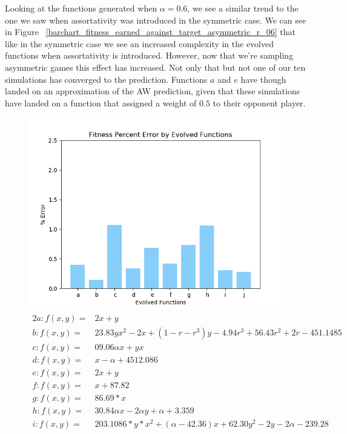 \documentclass[11pt]{book}
\newcommand*{\np}{\par\noindent\newline}
\begin{document}
\np Looking at the functions generated when $\alpha = 0.6$, we see a similar trend to the one we saw when assortativity was introduced in the symmetric case.
We can see in Figure ~\ref{barchart_fitness_earned_against_target_asymmetric_r_06} that like in the symmetric case we see an increased complexity in the evolved functions when assortativity is introduced.
However, now that we're sampling asymmetric games this effect has increased.
Not only that but not one of our ten simulations has converged to the prediction.
Functions $a$ and $e$ have though landed on an approximation of the AW prediction, given that these simulations have landed on a function that assigned a weight of $0.5$ to their opponent player.


\begin{figure}
	\centering
	\includegraphics[scale=0.7]{resources/asymmetric_percenterror_barchart_fitness_earned_against_target_asymmetric_r_06.png}
	\begin{alignat*}{2}
		a: f(x, y) = & 2x + y\\
		b: f(x, y) = & 23.83yx^2 - 2x + (1 - r - r^3)y - 4.94r^3 + 56.43r ^2 + 2r - 451.1485\\
		c: f(x, y) = & 09.06\alpha x + yx\\
		d: f(x, y) = & x - \alpha + 4512.086\\
		e: f(x, y) = & 2x + y\\
		f: f(x, y) = & x+87.82\\
		g: f(x, y) = & 86.69*x\\
		h: f(x, y) = & 30.84\alpha x - 2\alpha y +\alpha + 3.359\\
		i: f(x, y) = & 203.1086*y*x^2 +(\alpha - 42.36)x + 62.30y^2 - 2y  -2\alpha -239.28\\

\end{alignat*}
\end{figure}
\end{document}
